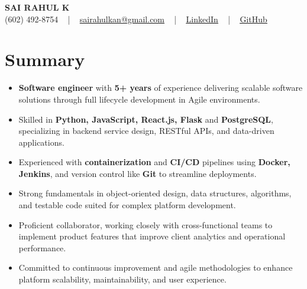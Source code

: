 \documentclass[letterpaper,11pt]{article}
\newcommand{\resumeItem}[1]{
  \item\footnotesize{
    {#1 \vspace{-2pt}}
  }
}
\newcommand{\resumeItemListStart}{\begin{itemize}[leftmargin=*]}
\newcommand{\resumeItemListEnd}{\end{itemize}\vspace{-5pt}}
\begin{document}
\begin{center}
    {\fontsize{14pt}{12pt}\selectfont \textbf{\MakeUppercase{Sai Rahul K}}}\\ \vspace{2pt}
    \fontsize{10pt}{12pt}\selectfont (602) 492-8754 ~ | ~ \href{mailto:sairahulkan@gmail.com}{sairahulkan@gmail.com} ~ | ~
    \href{https://www.linkedin.com/in/rq123/}{\color{blue}\underline{LinkedIn}} ~ | ~
    \href{https://github.com/kanrahuldo}{\color{blue}\underline{GitHub}}~
    \vspace{-8pt}
\end{center}

\section{Summary}
\fontsize{9pt}{10pt}\selectfont
\resumeItemListStart
    \resumeItem{\textbf{Software engineer} with \textbf{5+ years} of experience delivering scalable software solutions through full lifecycle development in Agile environments.} \vspace{-3pt}
    \resumeItem{Skilled in \textbf{Python, JavaScript, React.js, Flask} and \textbf{PostgreSQL}, specializing in backend service design, RESTful APIs, and data-driven applications.} \vspace{-3pt}
    \resumeItem{Experienced with \textbf{containerization} and \textbf{CI/CD} pipelines using \textbf{Docker, Jenkins}, and version control like \textbf{Git} to streamline deployments.} \vspace{-3pt}
    \resumeItem{Strong fundamentals in object-oriented design, data structures, algorithms, and testable code suited for complex platform development.} \vspace{-3pt}
    \resumeItem{Proficient collaborator, working closely with cross-functional teams to implement product features that improve client analytics and operational performance.} \vspace{-3pt}
    \resumeItem{Committed to continuous improvement and agile methodologies to enhance platform scalability, maintainability, and user experience.}
\resumeItemListEnd
\vspace{-6pt}
\end{document}
